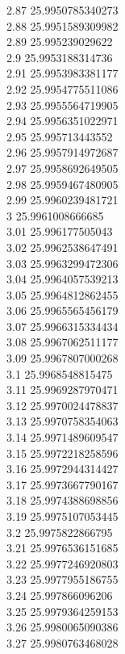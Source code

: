 {2.87	25.9950785340273\\
2.88	25.9951589309982\\
2.89	25.995239029622\\
2.9	25.9953188314736\\
2.91	25.9953983381177\\
2.92	25.9954775511086\\
2.93	25.9955564719905\\
2.94	25.9956351022971\\
2.95	25.995713443552\\
2.96	25.9957914972687\\
2.97	25.9958692649505\\
2.98	25.9959467480905\\
2.99	25.9960239481721\\
3	25.9961008666685\\
3.01	25.996177505043\\
3.02	25.9962538647491\\
3.03	25.9963299472306\\
3.04	25.9964057539213\\
3.05	25.9964812862455\\
3.06	25.9965565456179\\
3.07	25.9966315334434\\
3.08	25.9967062511177\\
3.09	25.9967807000268\\
3.1	25.9968548815475\\
3.11	25.9969287970471\\
3.12	25.9970024478837\\
3.13	25.9970758354063\\
3.14	25.9971489609547\\
3.15	25.9972218258596\\
3.16	25.9972944314427\\
3.17	25.9973667790167\\
3.18	25.9974388698856\\
3.19	25.9975107053445\\
3.2	25.9975822866795\\
3.21	25.9976536151685\\
3.22	25.9977246920803\\
3.23	25.9977955186755\\
3.24	25.997866096206\\
3.25	25.9979364259153\\
3.26	25.9980065090386\\
3.27	25.9980763468028\\
}
